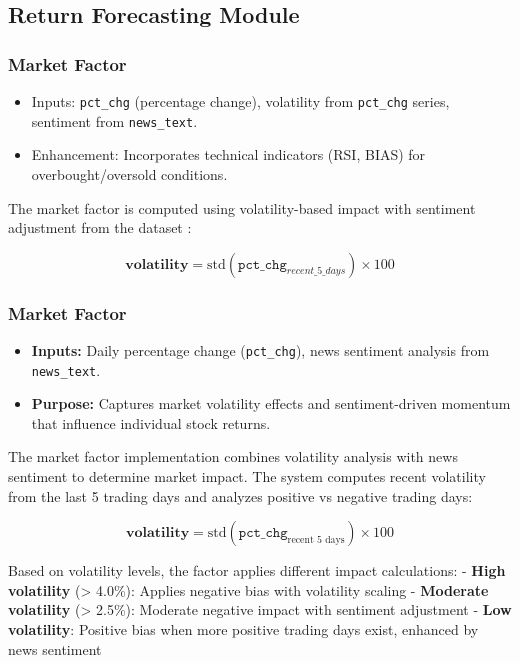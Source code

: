 \documentclass[3p,times,procedia]{elsarticle}
\begin{document}
\subsection{{Return Forecasting Module}}
\subsubsection{{Market Factor}}
\begin{itemize}
    \item Inputs: \texttt{pct\_chg} (percentage change), volatility from \texttt{pct\_chg} series, sentiment from \texttt{news\_text}.
    \item Enhancement: Incorporates technical indicators (RSI, BIAS) for overbought/oversold conditions.
\end{itemize}

The market factor is computed using volatility-based impact with sentiment adjustment from the dataset \cite{FinReportDataset2025}:

\begin{equation}
\textbf{volatility} = \text{std}(\texttt{pct\_chg}_{recent\_5\_days}) \times 100
\end{equation}

\subsubsection{{Market Factor}}
\begin{itemize}
    \item \textbf{Inputs:} Daily percentage change (\texttt{pct\_chg}), news sentiment analysis from \texttt{news\_text}.
    \item \textbf{Purpose:} Captures market volatility effects and sentiment-driven momentum that influence individual stock returns.
\end{itemize}

The market factor implementation combines volatility analysis with news sentiment to determine market impact. The system computes recent volatility from the last 5 trading days and analyzes positive vs negative trading days:

\begin{equation}
\textbf{volatility} = \text{std}(\texttt{pct\_chg}_{\text{recent 5 days}}) \times 100
\end{equation}

Based on volatility levels, the factor applies different impact calculations:
- \textbf{High volatility} (> 4.0\%): Applies negative bias with volatility scaling
- \textbf{Moderate volatility} (> 2.5\%): Moderate negative impact with sentiment adjustment  
- \textbf{Low volatility}: Positive bias when more positive trading days exist, enhanced by news sentiment
\end{document}
